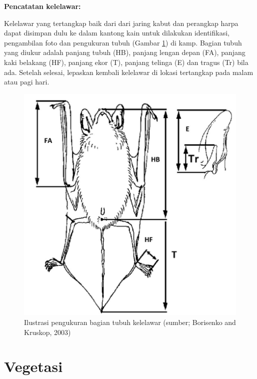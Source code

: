 \documentclass[
]{book}
\begin{document}
\textbf{Pencatatan kelelawar:}

Kelelawar yang tertangkap baik dari dari jaring kabut dan perangkap harpa dapat disimpan dulu ke dalam kantong kain untuk dilakukan identifikasi, pengambilan foto dan pengukuran tubuh (Gambar \ref{fig:kelmor}) di kamp. Bagian tubuh yang diukur adalah panjang tubuh (HB), panjang lengan depan (FA), panjang kaki belakang (HF), panjang ekor (T), panjang telinga (E) dan tragus (Tr) bila ada. Setelah selesai, lepaskan kembali kelelawar di lokasi tertangkap pada malam atau pagi hari.

\begin{figure}

{\centering \includegraphics[width=1\linewidth]{images/kfm_ilustration} 

}

\caption{Ilustrasi pengukuran bagian tubuh kelelawar (sumber; Borisenko and Kruskop, 2003)}\label{fig:kelmor}
\end{figure}

\hypertarget{vegetasi}{%
\section*{Vegetasi}\label{vegetasi}}
\end{document}
